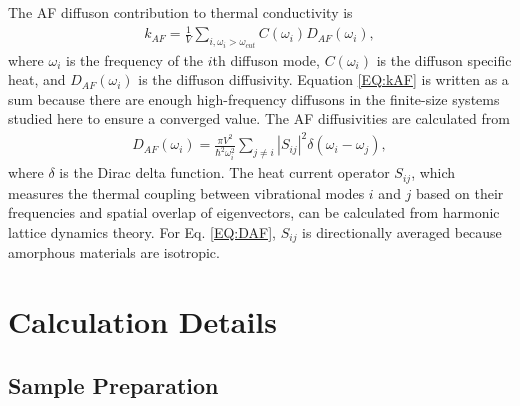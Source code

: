 \documentclass[aps,prb,onecolumn,preprint,superscriptaddress,footinbib,amsmath,amssymb,floatfix]{revtex4}
\begin{document}
The AF diffuson contribution to thermal conductivity is
\cite{feldman_thermal_1993,feldman_numerical_1999}
\begin{equation}\label{EQ:kAF}
\begin{split}
k_{AF} = \frac{1}{V}\sum_{i,\omega_i>\omega_{cut}} 
C(\omega_i) D_{AF}(\omega_i), 
\end{split}
\end{equation}
where $\omega_i$ is the frequency of the $i$th diffuson mode, 
$C(\omega_i)$ is the diffuson specific heat, and $D_{AF}(\omega_i)$ 
is the diffuson diffusivity. Equation \eqref{EQ:kAF} is written as a 
sum because there are enough high-frequency diffusons in the 
finite-size systems studied here to ensure a converged 
value.  
The AF diffusivities are calculated from\cite{allen_thermal_1993} 
\begin{equation}\label{EQ:DAF}
\begin{split}
D_{AF}(\omega_i) = \frac{\pi V^2}{\hbar^2\omega^2_i}\sum_{j\neq i}
|S_{ij}|^2 \delta(\omega_i - \omega_j),
\end{split}
\end{equation}
where $\delta$ is the Dirac delta 
function.\cite{mfp_fn1} 
The heat current operator $S_{ij}$, which measures the thermal coupling 
between vibrational modes $i$ and $j$ based on their frequencies and 
spatial overlap of eigenvectors, 
can be calculated from harmonic lattice dynamics theory.  
For Eq. \eqref{EQ:DAF}, $S_{ij}$ is directionally averaged because 
amorphous materials are isotropic. 

\section{\label{S:Calculation}Calculation Details}

\subsection{\label{S:Sample}Sample Preparation}
\end{document}
